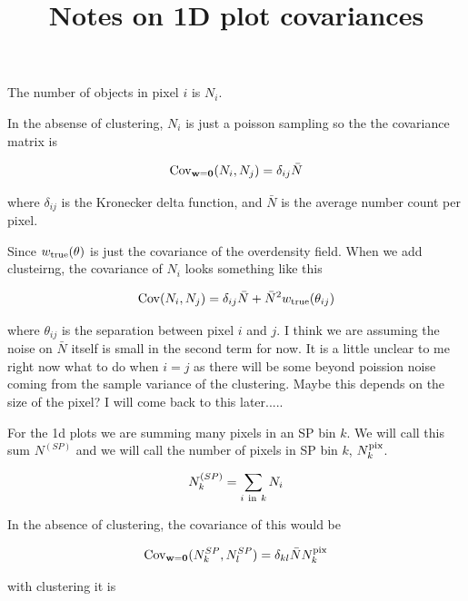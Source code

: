 \documentclass[12pt]{article}
\begin{document}
 
\title{Notes on 1D plot covariances}
\maketitle

The number of objects in pixel $i$ is $N_i$.

In the absense of clustering, $N_i$ is just a poisson sampling so the the covariance matrix is


\begin{equation}
{\bf {\rm Cov}_{w=0}}(N_i,N_j) = \delta_{ij}{\bar N}
\end{equation}

where $\delta_{ij}$ is the Kronecker delta function, and ${\bar N}$ is the average number count per pixel. 

Since $w_{\rm true}(\theta)$ is just the covariance of the overdensity field. When we add clusteirng, the covariance of $N_i$ looks something like this

\begin{equation}
{\bf {\rm Cov}}(N_i,N_j) = \delta_{ij}{\bar N} + {\bar N}^2 w_{\rm true}(\theta_{ij})
\end{equation}

where $\theta_{ij}$ is the separation between pixel $i$ and $j$. I think we are assuming the noise on ${\bar N}$ itself is small in the second term for now. It is a little unclear to me right now what to do when $i=j$ as there will be some beyond poission noise coming from the sample variance of the clustering. Maybe this depends on the size of the pixel? I will come back to this later.....

For the 1d plots we are summing many pixels in an SP bin $k$. We will call this sum $N^{(SP)}$ and we will call the number of pixels in SP bin $k$, $N^{\rm pix}_{k}$.

\begin{equation}
N^{(SP)}_{k} = \sum_{i { \ \rm in \ } k} N_{i}
\end{equation}

In the absence of clustering, the covariance of this would be 

\begin{equation}
{\bf {\rm Cov}_{w=0}}(N^{SP}_k, N^{SP}_l) = \delta_{kl} {\bar N} N^{\rm pix}_{k}
\end{equation}

with clustering it is
\end{document}

